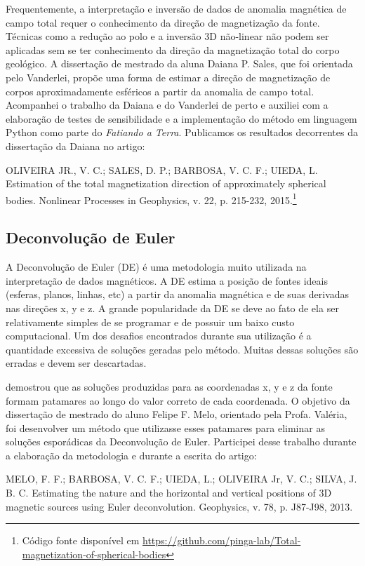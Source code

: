 Frequentemente, a interpretação e inversão de dados de anomalia magnética de
campo total requer o conhecimento da direção de magnetização da fonte.
Técnicas como a redução ao polo e a inversão 3D não-linear não podem ser
aplicadas sem se ter conhecimento da direção da magnetização total do corpo
geológico.
A dissertação de mestrado da aluna Daiana P. Sales, que foi orientada pelo
Vanderlei, propõe uma forma de estimar a direção de magnetização de corpos
aproximadamente esféricos a partir da anomalia de campo total.
Acompanhei o trabalho da Daiana e do Vanderlei de perto e auxiliei com a
elaboração de testes de sensibilidade e a implementação do método em linguagem
Python como parte do \textit{Fatiando a Terra}.
Publicamos os resultados decorrentes da dissertação da Daiana no artigo:

\begin{displayquote}
    OLIVEIRA JR., V. C.; SALES, D. P.; BARBOSA, V. C. F.; UIEDA, L. Estimation
    of the total magnetization direction of approximately spherical bodies.
    Nonlinear Processes in Geophysics, v. 22, p. 215-232, 2015.\footnote{Código
    fonte disponível em
    \url{https://github.com/pinga-lab/Total-magnetization-of-spherical-bodies}}
\end{displayquote}



\subsection{Deconvolução de Euler}

A Deconvolução de Euler (DE) \citep{thompson1982,reid1990} é uma metodologia
muito utilizada na interpretação de dados magnéticos.
A DE estima a posição de fontes ideais (esferas, planos, linhas, etc)
a partir da anomalia magnética e de suas derivadas nas direções x, y e z.
A grande popularidade da DE se deve ao fato de ela ser relativamente simples de
se programar e de possuir um baixo custo computacional.
Um dos desafios encontrados durante sua utilização é a quantidade excessiva de
soluções geradas pelo método.
Muitas dessas soluções são erradas e devem ser descartadas.

\citet{barbosa1999} demostrou que as soluções produzidas para as coordenadas x,
y e z da fonte formam patamares ao longo do valor correto de cada coordenada.
O objetivo da dissertação de mestrado do aluno Felipe F. Melo, orientado pela
Profa. Valéria, foi desenvolver um método que utilizasse esses patamares para
eliminar as soluções esporádicas da Deconvolução de Euler.
Participei desse trabalho durante a elaboração da metodologia e durante a
escrita do artigo:

\begin{displayquote}
    MELO, F. F.; BARBOSA, V. C. F.; UIEDA, L.; OLIVEIRA Jr, V. C.; SILVA, J. B.
    C.  Estimating the nature and the horizontal and vertical positions of 3D
    magnetic sources using Euler deconvolution. Geophysics, v. 78, p. J87-J98,
    2013.
\end{displayquote}
